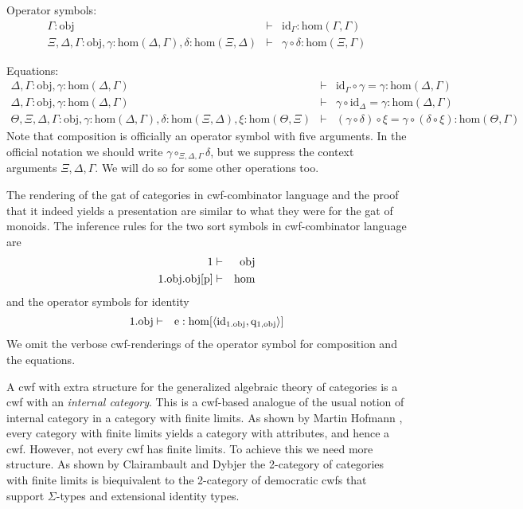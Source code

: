 \documentclass{lmcs}
\newcommand{\FYI}[1]{{\color{red}#1}}
\def\Obj{\mathrm{obj}}
\def\Ctx{\mathrm{Ctx}}
\def\Hom{\mathrm{hom}}
\def\id{\mathrm{id}}
\def\idmon{\mathrm{e}}
\begin{document}
Operator symbols:
\begin{eqnarray*}
\Gamma : \Obj &\vdash& \id_\Gamma : \Hom(\Gamma,\Gamma)\\
\Xi,\Delta,\Gamma : \Obj, \gamma : \Hom(\Delta,\Gamma), \delta : \Hom(\Xi,\Delta) &\vdash&
\gamma \circ \delta : \Hom(\Xi,\Gamma)
\end{eqnarray*}

Equations:
\begin{eqnarray*}
\Delta, \Gamma : \Obj, \gamma : \Hom(\Delta,\Gamma) &\vdash& \id_\Gamma \circ \gamma = \gamma : \Hom(\Delta,\Gamma)\\
\Delta, \Gamma : \Obj, \gamma : \Hom(\Delta,\Gamma) &\vdash& \gamma \circ \id_\Delta = \gamma : \Hom(\Delta,\Gamma)\\
\Theta, \Xi,\Delta,\Gamma : \Obj, \gamma : \Hom(\Delta,\Gamma), \delta : \Hom(\Xi,\Delta), \xi : \Hom(\Theta,\Xi) &\vdash&
(\gamma \circ \delta) \circ \xi = \gamma \circ (\delta \circ \xi): \Hom(\Theta,\Gamma)
\end{eqnarray*}
Note that composition is officially an operator symbol with five arguments. In the official notation we should write $\gamma \circ_{\Xi,\Delta,\Gamma} \delta$, but we suppress the context arguments $\Xi,\Delta,\Gamma$. We will do so for some other operations too.

The rendering of the gat of categories in cwf-combinator language and the proof that it indeed yields a \FYI{presentation} are similar to what they were for the gat of monoids. The inference rules for the two sort symbols in cwf-combinator language are
\begin{eqnarray*}
1 &\vdash& \Obj\\
1.\Obj.\Obj[\p] &\vdash& \Hom
\end{eqnarray*}
and the operator symbols for identity
\begin{eqnarray*}
1.\Obj &\vdash& \idmon : \Hom[\tuple{\id_{1.\Obj},\q_{1,\Obj}}]
\end{eqnarray*}
We omit the verbose cwf-renderings of the operator symbol for composition and the equations.

A cwf with extra structure for the generalized algebraic theory of categories is a cwf with an {\em internal category}. This is a cwf-based analogue of the usual notion of internal category in a category with finite limits. As shown by Martin Hofmann \cite{hofmann:csl,hofmann:cambridge}, every category with finite limits yields a category with attributes, and hence a cwf. However, not every cwf has finite limits. To achieve this we need more structure. As shown by Clairambault and Dybjer \cite{ClairambaultD11,ClairambaultD14} the 2-category of categories with finite limits is biequivalent to the 2-category of democratic cwfs that support $\Sigma$-types and extensional identity types.
\end{document}
